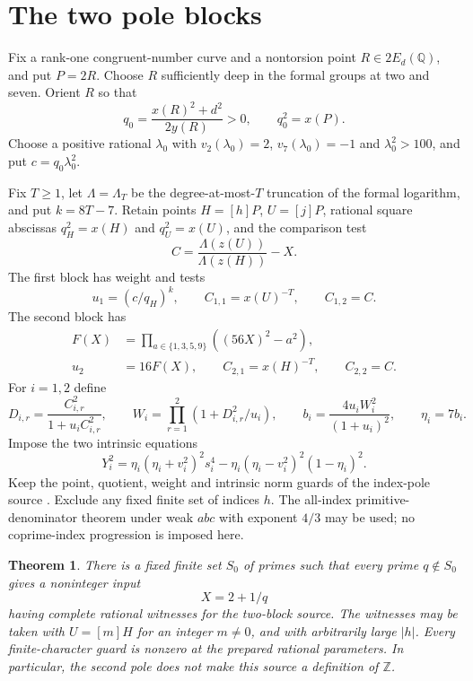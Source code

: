 \documentclass[11pt,a4paper]{article}
\newtheorem{theorem}{Theorem}[section]
\newcommand{\Q}{\mathbb Q}\newcommand{\Z}{\mathbb Z}
\begin{document}
\section{The two pole blocks}

Fix a rank-one congruent-number curve and a nontorsion point
$R\in2E_d(\Q)$, and put $P=2R$. Choose $R$ sufficiently deep in the formal
groups at two and seven. Orient $R$ so that
\[
 q_0=\frac{x(R)^2+d^2}{2y(R)}>0,\qquad q_0^2=x(P).
\]
Choose a positive rational $\lambda_0$ with
$v_2(\lambda_0)=2$, $v_7(\lambda_0)=-1$ and
$\lambda_0^2>100$, and put $c=q_0\lambda_0^2$.

Fix $T\ge1$, let $\Lambda=\Lambda_T$ be the degree-at-most-$T$
truncation of the formal logarithm, and put $k=8T-7$. Retain
points $H=[h]P$, $U=[j]P$, rational square abscissas
$q_H^2=x(H)$ and $q_U^2=x(U)$, and the comparison test
\[
             C=\frac{\Lambda(z(U))}{\Lambda(z(H))}-X.
\]
The first block has weight and tests
\[
        u_1=(c/q_H)^k,\qquad C_{1,1}=x(U)^{-T},
                          \qquad C_{1,2}=C.
\]
The second block has
\begin{equation}\label{eq:input-weight}
 \begin{split}
 F(X)&=\prod_{a\in\{1,3,5,9\}}((56X)^2-a^2),\\
 u_2&=16F(X),\qquad C_{2,1}=x(H)^{-T},
                         \qquad C_{2,2}=C.
 \end{split}
\end{equation}
For $i=1,2$ define
\[
 D_{i,r}=\frac{C_{i,r}^2}{1+u_iC_{i,r}^2},\qquad
 W_i=\prod_{r=1}^2(1+D_{i,r}^2/u_i),\qquad
 b_i=\frac{4u_iW_i^2}{(1+u_i)^2},\qquad \eta_i=7b_i.
\]
Impose the two intrinsic equations
\begin{equation}\label{eq:intrinsic}
 Y_i^2=\eta_i(\eta_i+v_i^2)^2s_i^4
       -\eta_i(\eta_i-v_i^2)^2(1-\eta_i)^2.
\end{equation}
Keep the point, quotient, weight and intrinsic norm guards
of the index-pole source \cite{Index}. Exclude any fixed finite
set of indices $h$. The all-index primitive-denominator theorem
under weak $abc$ with exponent $4/3$ may be used; no coprime-index
progression is imposed here.

\begin{theorem}\label{thm:false-inputs}
There is a fixed finite set $S_0$ of primes such that every prime
$q\notin S_0$ gives a noninteger input
\[
                              X=2+1/q
\]
having complete rational witnesses for the two-block source.
The witnesses may be taken with $U=[m]H$ for an integer
$m\ne0$, and with arbitrarily large $|h|$.
Every finite-character guard is nonzero at the prepared rational
parameters. In particular, the second pole does not make this
source a definition of $\Z$.
\end{theorem}
\end{document}
